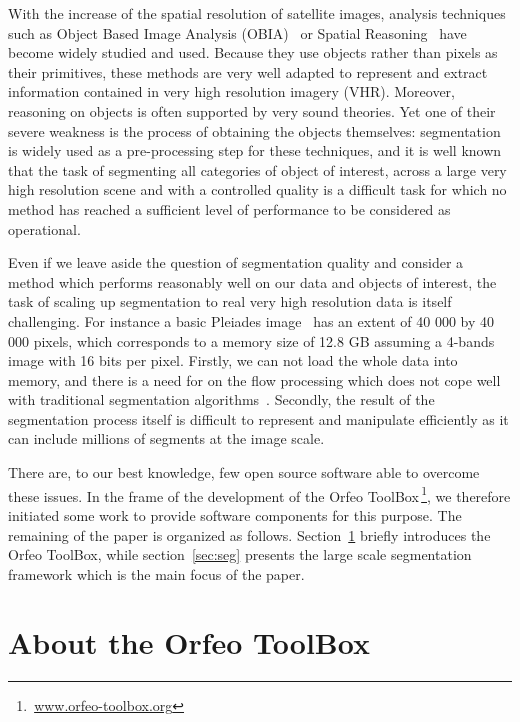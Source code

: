 \documentclass{josis}
\newcommand{\furl}[1]{$\,$\footnote{$\,$\url{#1}}}
\begin{document}
With the increase of the spatial resolution of satellite images,
analysis techniques such as Object Based Image Analysis
(OBIA)~\cite{michel2010lazy} or Spatial
Reasoning~\cite{inglada2009qualitative,vanegas2009fuzzy,vanegas2010detection}
have become widely studied and used. Because they use objects rather
than pixels as their primitives, these methods are very well adapted
to represent and extract information contained in very high
resolution imagery (VHR). Moreover, reasoning on objects is often
supported by very sound theories. Yet one of their severe weakness is
the process of obtaining the objects themselves: segmentation is
widely used as a pre-processing step for these techniques, and it is
well known that the task of segmenting all categories of object of
interest, across a large very high resolution scene and with a
controlled quality is a difficult task for which no method has reached
a sufficient level of performance to be considered as operational.

Even if we leave aside the question of segmentation quality and
consider a method which performs reasonably well on our data
and objects of interest, the task of scaling up segmentation to real
very high resolution data is itself challenging.  For instance a basic
Pleiades image~\cite{tinel2012orfeo} has an extent of 40 000 by 40 000
pixels, which corresponds to a memory size of 12.8 GB assuming a
4-bands image with 16 bits per pixel. Firstly, we can not load the
whole data into memory, and there is a need for on the flow processing
which does not cope well with traditional segmentation
algorithms~\cite{shi2000normalized}. Secondly, the result of the
segmentation process itself is difficult to represent and manipulate
efficiently as it can include millions of segments at the image scale.

There are, to our best knowledge, few open source software able to
overcome these issues. In the frame of the development of the Orfeo
ToolBox\furl{www.orfeo-toolbox.org}, we therefore initiated some work
to provide software components for this purpose. The remaining of the
paper is organized as follows. Section~\ref{sec:otb} briefly
introduces the Orfeo ToolBox, while section~\ref{sec:seg}
presents the large scale segmentation framework which is the main
focus of the paper.

\section{About the Orfeo ToolBox}\label{sec:otb}
\end{document}
